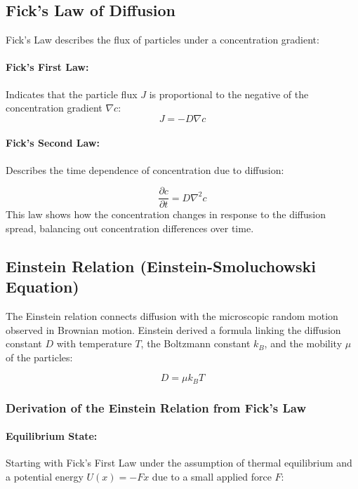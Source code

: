 \documentclass[12pt,english,ngerman]{scrartcl}
\begin{document}
\subsection{Fick's Law of Diffusion}

Fick's Law describes the flux of particles under a concentration gradient:

\paragraph{Fick's First Law:} Indicates that the particle flux $J$ is proportional to the negative of the
concentration gradient $\nabla c$:
\begin{equation}
	J = -D \nabla c
	\label{eq:ficks_first_law}
\end{equation}
\paragraph{Fick's Second Law:} Describes the time dependence of concentration due to diffusion:

\begin{equation}
	\frac{\partial c}{\partial t} = D \nabla^2 c
	\label{eq:ficks_second_law}
\end{equation}
This law shows how the concentration changes in response to
the diffusion spread, balancing out concentration differences over time.\cite{fickUeberDiffusion1855}

\subsection{Einstein Relation (Einstein-Smoluchowski Equation)}

The Einstein relation connects diffusion with the microscopic random motion
observed in Brownian motion. Einstein derived a formula linking the diffusion
constant $D$ with temperature $T$, the Boltzmann constant $k_B$, and the
mobility $\mu$ of the particles:

\begin{equation}
	D = \mu k_B T
	\label{eq:einstein_relation}
\end{equation}

\subsubsection{Derivation of the Einstein Relation from Fick's Law}

\paragraph{Equilibrium State:} Starting with Fick's First Law under the assumption of thermal equilibrium and
a potential energy $U(x)=−Fx$ due to a small applied force $F$:
\end{document}
